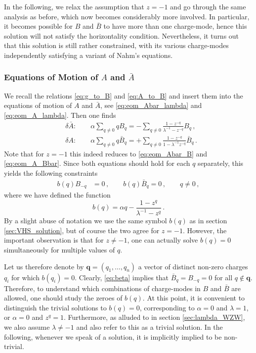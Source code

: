 \documentclass[11pt,a4paper]{article}
\numberwithin{equation}{section}
\numberwithin{table}{section}\setlength{\multlinegap}{25pt}
\begin{document}
In the following, we relax the assumption that $z=-1$ and go through the same analysis as before, which now becomes considerably more involved. In particular, it becomes possible for $B$ and $\bar{B}$ to have more than one charge-mode, hence this solution will not satisfy the horizontality condition. Nevertheless, it turns out that this solution is still rather constrained, with its various charge-modes independently satisfying a variant of Nahm's equations. 

\subsubsection*{Equations of Motion of $A$ and $\bar{A}$}

We recall the relations \eqref{eq:g_to_B} and \eqref{eq:A_to_B} and insert them into the equations of motion of $A$ and $\bar{A}$, see \eqref{eq:eom_Abar_lambda} and \eqref{eq:eom_A_lambda}. Then one finds
\begin{align}
	&\delta\bar{A}:\qquad \alpha \sum_{q\neq 0} q B_{q}= -\sum_{q\neq 0}\frac{1-z^{-q}}{\lambda^{-1}-z^{-q}}B_q\,,\\
	&\delta A:\qquad\alpha \sum_{q\neq 0} q \bar{B}_{q}=+\sum_{q\neq 0}\frac{1-z^{-q}}{1-\lambda^{-1}z^{-q}}\bar{B}_q\,.
\end{align}
Note that for $z=-1$ this indeed reduces to \eqref{eq:eom_Abar_B} and \eqref{eq:eom_A_Bbar}. Since both equations should hold for each $q$ separately, this yields the following constraints
\begin{align}\label{eq:beta}
	b(q)B_{-q} & =0\,, \qquad b(q)\bar{B}_q = 0\,,\qquad q\neq 0\,,
\end{align}
where we have defined the function
\begin{equation}\label{eq:def_beta}
	b(q)=\alpha q - \frac{1-z^{q}}{\lambda^{-1}-z^{q}}\,.
\end{equation}
By a slight abuse of notation we use the same symbol $b(q)$ as in section \ref{sec:VHS_solution}, but of course the two agree for $z=-1$. However, the important observation is that for $z\neq -1$, one can actually solve $b(q)=0$ simultaneously for multiple values of $q$. 

Let us therefore denote by $\mathbf{q}=(q_1,\ldots, q_n)$ a vector of distinct non-zero charges $q_i$ for which $b(q_i)=0$. Clearly, \eqref{eq:beta} implies that $\bar{B}_q=B_{-q}=0$ for all $q\not\in\mathbf{q}$. Therefore, to understand which combinations of charge-modes in $B$ and $\bar{B}$ are allowed, one should study the zeroes of $b(q)$. At this point, it is convenient to distinguish the trivial solutions to $b(q)=0$, corresponding to $\alpha=0$ and $\lambda=1$, or $\alpha=0$ and $z^{q}=1$. Furthermore, as alluded to in section \ref{sec:lambda_WZW}, we also assume $\lambda\neq -1$ and also refer to this as a trivial solution. In the following, whenever we speak of a solution, it is implicitly implied to be non-trivial.
\end{document}
